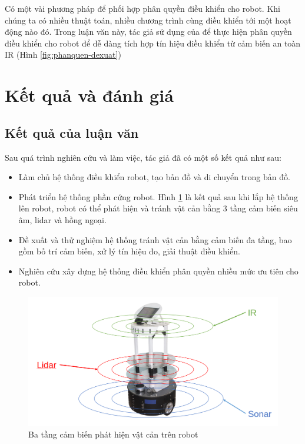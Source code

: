 {Có một vài phương pháp để phối hợp phân quyền điều khiển cho robot. Khi chúng ta có nhiều thuật toán, nhiều chương trình cùng điều khiển tới một hoạt động nào đó.
Trong luận văn này, tác giả sử dụng  của  để thực hiện phân quyền điều khiển cho robot để dễ dàng tích hợp tín hiệu điều khiển từ cảm biến an toàn IR (Hình \ref{fig:phanquen-dexuat})

\section{Kết quả và đánh giá}
\label{sec:testbed}


\subsection{Kết quả của luận văn}

Sau quá trình nghiên cứu và làm việc, tác giả đã có một số kết quả như sau:
\begin{itemize}
    \item Làm chủ hệ thống điều khiển robot, tạo bản đồ và di chuyển trong bản đồ.
    \item Phát triển hệ thống phần cứng robot. Hình \ref{fig:RB-multi-sensor-layer} là kết quả sau khi lắp hệ thống lên robot, robot có thể phát hiện và tránh vật cản bằng 3 tầng cảm biến siêu âm, lidar và hồng ngoại.
    \item Đề xuất và thử nghiệm hệ thống tránh vật cản bằng cảm biến đa tầng, bao gồm bố trí cảm biến, xử lý tín hiệu đo, giải thuật điều khiển.
    \item Nghiên cứu xây dựng hệ thống điều khiển phân quyền nhiều mức ưu tiên cho robot.
\end{itemize}

\begin{figure}[htbp]
    \centering
    \includegraphics[width=0.75\linewidth]{figures/rb_Multi_Sensor_layer.png}
    \caption{Ba tầng cảm biến phát hiện vật cản trên robot}
    \label{fig:RB-multi-sensor-layer}
\end{figure}

}
